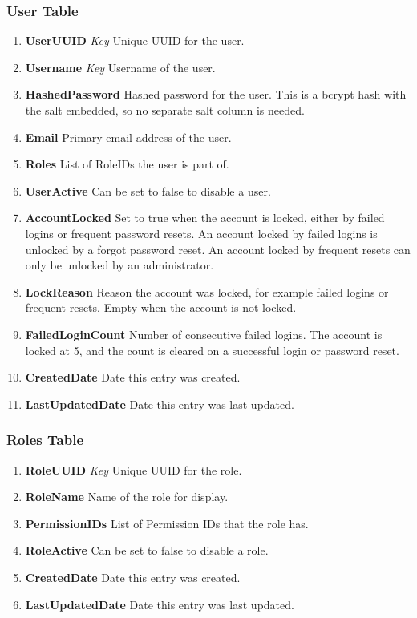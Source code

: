         \subsubsection{User Table}
            \begin{enumerate}[leftmargin=3\parindent]
                \item \textbf{UserUUID} \textit{Key} Unique UUID for the user.
                \item \textbf{Username} \textit{Key} Username of the user.
                \item \textbf{HashedPassword} Hashed password for the user. This is a bcrypt hash with the salt embedded, so no separate salt column is needed.
                \item \textbf{Email} Primary email address of the user.
                \item \textbf{Roles} List of RoleIDs the user is part of.
                \item \textbf{UserActive} Can be set to false to disable a user.
                \item \textbf{AccountLocked} Set to true when the account is locked, either by failed logins or frequent password resets. An account locked by failed logins is unlocked by a forgot password reset. An account locked by frequent resets can only be unlocked by an administrator.
                \item \textbf{LockReason} Reason the account was locked, for example failed logins or frequent resets. Empty when the account is not locked.
                \item \textbf{FailedLoginCount} Number of consecutive failed logins. The account is locked at 5, and the count is cleared on a successful login or password reset.
                \item \textbf{CreatedDate} Date this entry was created.
                \item \textbf{LastUpdatedDate} Date this entry was last updated.
            \end{enumerate}

        \subsubsection{Roles Table}
            \begin{enumerate}[leftmargin=3\parindent]
                \item \textbf{RoleUUID} \textit{Key} Unique UUID for the role.
                \item \textbf{RoleName} Name of the role for display.
                \item \textbf{PermissionIDs} List of Permission IDs that the role has.
                \item \textbf{RoleActive} Can be set to false to disable a role.
                \item \textbf{CreatedDate} Date this entry was created.
                \item \textbf{LastUpdatedDate} Date this entry was last updated.
            \end{enumerate}

